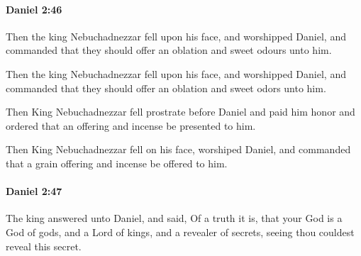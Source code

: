 		\paragraph{Daniel 2:46} %
			\label{DANIEL-2-46}

			Then the king Nebuchadnezzar fell upon his face, and worshipped Daniel, and commanded that they should offer an oblation and sweet odours unto him.

			\begin{versebox}
					\item[BHS] 
					\item[LXX] 
					\item[ASV] Then the king Nebuchadnezzar fell upon his face, and worshipped Daniel, and commanded that they should offer an oblation and sweet odors unto him.
					\item[NIV] Then King Nebuchadnezzar fell prostrate before Daniel and paid him honor and ordered that an offering and incense be presented to him.
					\item[NRSV] Then King Nebuchadnezzar fell on his face, worshiped Daniel, and commanded that a grain offering and incense be offered to him.
			\end{versebox}

		\paragraph{Daniel 2:47} %
			\label{DANIEL-2-47}

			The king answered unto Daniel, and said, Of a truth it is, that your God is a God of gods, and a Lord of kings, and a revealer of secrets, seeing thou couldest reveal this secret.

